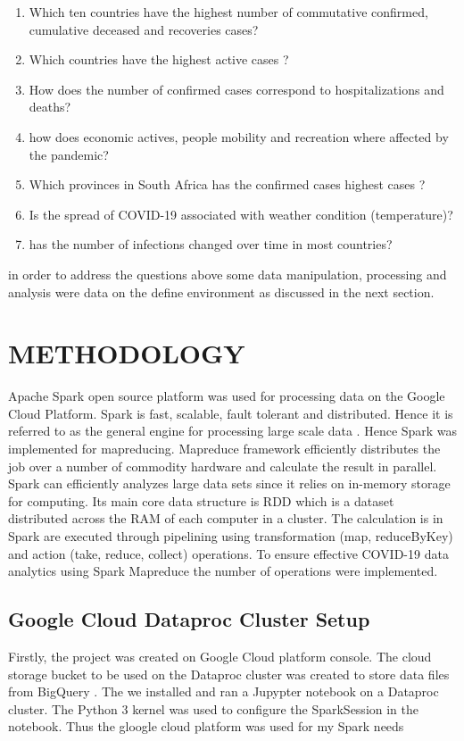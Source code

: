 \documentclass[11pt]{article}
\begin{document}
\begin{enumerate}
    \item Which  ten countries have the highest number of commutative confirmed, cumulative deceased and recoveries cases?
    \item  Which countries have the highest active cases ?
    \item How does the number of confirmed cases correspond to hospitalizations and deaths?
    \item how does economic actives, people mobility and recreation where affected by the pandemic?
    \item Which provinces in South Africa has the  confirmed cases highest cases ?
    \item Is the spread of COVID-19 associated with weather condition (temperature)?
    \item has the number of infections changed over time in most countries?
\end{enumerate}

in order to address the questions above  some  data manipulation, processing and analysis were data on the define environment as discussed in the next section.

\section{METHODOLOGY}
Apache Spark open source platform was used for processing data on the Google Cloud Platform. Spark is fast, scalable, fault tolerant and distributed. Hence it is referred to as the general engine for processing large scale data  \cite{Chouksey and Chauhan, 2017}. Hence Spark was implemented for mapreducing. Mapreduce framework efficiently distributes the job over a number of commodity hardware and calculate the result in parallel. Spark can efficiently analyzes large data sets since it relies on in-memory storage for computing. Its main core data structure is RDD which is a dataset distributed across the RAM  of each computer in a cluster. The calculation is in Spark are executed through pipelining using transformation (map, reduceByKey) and action (take, reduce, collect) operations. To ensure effective COVID-19 data analytics using Spark Mapreduce the number of operations were implemented.

\subsection{ Google Cloud Dataproc Cluster Setup}
Firstly, the project was created on Google Cloud platform console. The cloud storage bucket to be used on the Dataproc cluster was created to store data files from BigQuery . The we installed and ran a Jupypter notebook on a Dataproc cluster. The Python 3 kernel was used to configure the SparkSession in the notebook.  Thus the gloogle cloud platform was used for my Spark needs
\end{document}
